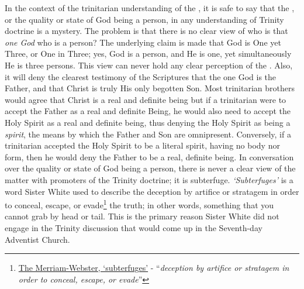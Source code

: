 In the context of the trinitarian understanding of the , it is safe to say that the , or the quality or state of God being a person, in any understanding of Trinity doctrine is a mystery. The problem is that there is no clear view of who is that \textit{one God} who is a person? The underlying claim is made that God is One yet Three, or One in Three; yes, God is a person, and He is one, yet simultaneously He is three persons. This view can never hold any clear perception of the . Also, it will deny the clearest testimony of the Scriptures that the one God is the Father, and that Christ is truly His only begotten Son. Most trinitarian brothers would agree that Christ is a real and definite being but if a trinitarian were to accept the Father as a real and definite Being, he would also need to accept the Holy Spirit as a real and definite being, thus denying the Holy Spirit as being a \textit{spirit}, the means by which the Father and Son are omnipresent. Conversely, if a trinitarian accepted the Holy Spirit to be a literal spirit, having no body nor form, then he would deny the Father to be a real, definite being. In conversation over the quality or state of God being a person, there is never a clear view of the matter with promoters of the Trinity doctrine; it is subterfuge. \textit{‘Subterfuges’} is a word Sister White used to describe the deception by artifice or stratagem in order to conceal, escape, or evade\footnote{\href{https://www.merriam-webster.com/dictionary/subterfuges}{The Merriam-Webster, ‘subterfuges’} - “\textit{deception by artifice or stratagem in order to conceal, escape, or evade}”} the truth; in other words, something that you cannot grab by head or tail. This is the primary reason Sister White did not engage in the Trinity discussion that would come up in the Seventh-day Adventist Church.


